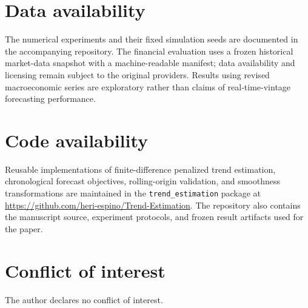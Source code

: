 \documentclass[11pt]{article}
\begin{document}
\section*{Data availability}
The numerical experiments and their fixed simulation seeds are documented in the accompanying repository. The financial evaluation uses a frozen historical market-data snapshot with a machine-readable manifest; data availability and licensing remain subject to the original providers. Results using revised macroeconomic series are exploratory rather than claims of real-time-vintage forecasting performance.

\section*{Code availability}
Reusable implementations of finite-difference penalized trend estimation, chronological forecast objectives, rolling-origin validation, and smoothness transformations are maintained in the \texttt{trend\_estimation} package at \url{https://github.com/heri-espino/Trend-Estimation}. The repository also contains the manuscript source, experiment protocols, and frozen result artifacts used for the paper.

\section*{Conflict of interest}
The author declares no conflict of interest.



\end{document}

